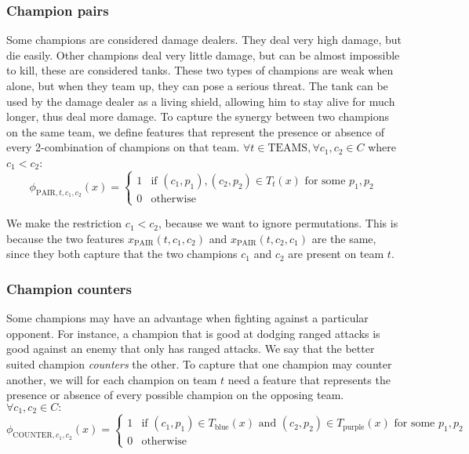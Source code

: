 \subsubsection{Champion pairs}
Some champions are considered damage dealers. They deal very high damage, but die easily. Other champions deal very little damage, but can be almost impossible to kill, these are considered tanks. These two types of champions are weak when alone, but when they team up, they can pose a serious threat. The tank can be used by the damage dealer as a living shield, allowing him to stay alive for much longer, thus deal more damage.
To capture the synergy between two champions on the same team, we define features that represent the presence or absence of every 2-combination of champions on that team. $\forall t \in \text{TEAMS}, \forall c_1, c_2 \in C$ where $c_1 < c_2$:
\begin{equation}\label{eq:pair}
\phi_{\text{PAIR}, t, c_1, c_2}(x) =
\begin{cases}
  1 & \text{if } (c_1, p_1), (c_2, p_2) \in T_t(x) \text{ for some }p_1, p_2\\
  0 & \text{otherwise}
\end{cases}
\end{equation}

We make the restriction $c_1 < c_2$, because we want to ignore permutations. This is because the two features $x_\text{PAIR}(t, c_1, c_2)$ and $x_\text{PAIR}(t, c_2, c_1)$ are the same, since they both capture that the two champions $c_1$ and $c_2$ are present on team $t$.

\subsubsection{Champion counters}
Some champions may have an advantage when fighting against a particular opponent.
For instance, a champion that is good at dodging ranged attacks is good against an enemy that only has ranged attacks.
We say that the better suited champion \emph{counters} the other.
To capture that one champion may counter another, we will for each champion on team $t$ need a feature that represents the presence or absence of every possible champion on the opposing team. $\forall c_1, c_2 \in C:$
\begin{equation}\label{eq:counter}
\phi_{\text{COUNTER},c_1,c_2}(x) = 
\begin{cases} 
1 & \text{if } (c_1, p_1) \in T_\text{blue}(x) \text{ and } (c_2, p_2) \in T_\text{purple}(x) \text{ for some } p_1, p_2 \\ 
0 & \text{otherwise} 
\end{cases}
\end{equation}

